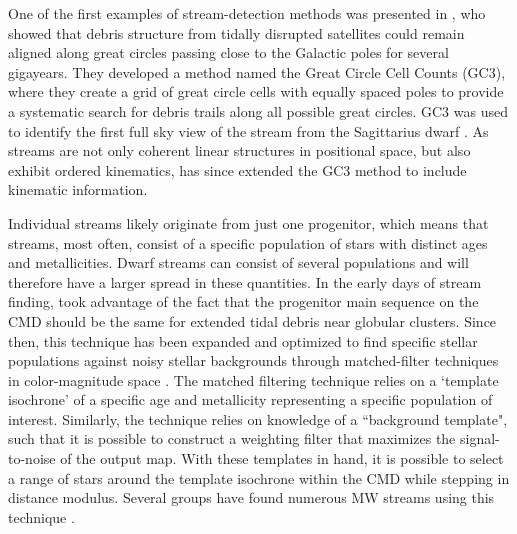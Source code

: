 \documentclass[twocolumn]{aastex631}
\begin{document}
One of the first examples of stream-detection methods was 
presented in \citet{johnston96}, who showed that debris structure from tidally disrupted satellites could remain aligned along great circles passing close to the Galactic poles for several gigayears. They developed a method named the Great Circle Cell Counts (GC3), where they create a grid of great circle cells with equally spaced poles to provide a systematic search for debris trails along all possible great circles. GC3 was used to identify the first full sky view of the stream from the Sagittarius dwarf \citep{ibata02b,majewski03}. As streams are not only coherent linear structures in positional space, but also exhibit ordered kinematics, \citet{mateu17} has since extended the GC3 method to include kinematic information. 

Individual streams likely originate from just one progenitor, which means that streams, most often, consist of a specific population of stars with distinct ages and metallicities. Dwarf streams can consist of several populations and will therefore have a larger spread in these quantities. In the early days of stream finding, \citet{grillmair95} took advantage of the fact that the progenitor main sequence on the CMD should be the same for extended tidal debris near globular clusters. Since then, this technique has been expanded and optimized to find specific stellar populations against noisy stellar backgrounds through matched-filter techniques in color-magnitude space \citep[e.g.,][]{Rockosi02}. The matched filtering technique relies on a `template isochrone' of a specific age and metallicity representing a specific population of interest. Similarly, the technique relies on knowledge of a ``background template", such that it is possible to construct a weighting filter that maximizes the signal-to-noise of the output map. With these templates in hand, it is possible to select a range of stars around the template isochrone within the CMD while stepping in distance modulus. Several groups have found numerous MW streams using this technique \citep[e.g.,][]{grillmair06,bonaca12,carlberg12,ibata16,Shipp18,ship20,thomas20}. 
\end{document}

